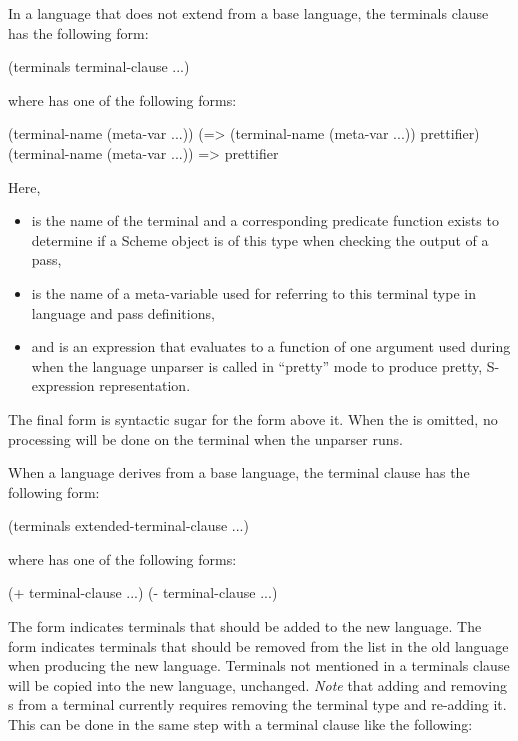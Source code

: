 \documentclass[letterpaper,10pt]{article}
\begin{document}
In a language that does not extend from a base language, the
terminals clause has the following form:

\begin{schemedisplay}
(terminals terminal-clause ...)
\end{schemedisplay}

where  has one of the following forms:

\begin{schemedisplay}
(terminal-name (meta-var ...))
(=> (terminal-name (meta-var ...)) prettifier)
(terminal-name (meta-var ...)) => prettifier
\end{schemedisplay}

Here,
\begin{itemize}
\item {} is the name of the terminal and a corresponding
 predicate function exists to determine if a
Scheme object is of this type when checking the output of a pass,
\item {} is the name of a meta-variable used for referring to this
terminal type in language and pass definitions,
\item and  is an expression that evaluates to a function of one
argument used during when the language unparser is called in ``pretty'' mode to
produce pretty, S-expression representation.
\end{itemize}
The final form is syntactic sugar for the form above it.
When the  is omitted, no processing will be done on the
terminal when the unparser runs.

When a language derives from a base language, the terminal clause has the following form:

\begin{schemedisplay}
(terminals extended-terminal-clause ...)
\end{schemedisplay}

where  has one of the following forms:

\begin{schemedisplay}
(+ terminal-clause ...)
(- terminal-clause ...)
\end{schemedisplay}

The \scheme{+} form indicates terminals that should be added to the new language.
The \scheme{-} form indicates terminals that should be removed from the list in
the old language when producing the new language.
Terminals not mentioned in a terminals clause will be copied into the new
language, unchanged.
\emph{Note} that adding and removing s from a terminal currently requires removing the terminal type and re-adding it.
This can be done in the same step with a terminal clause like the following:
\end{document}
